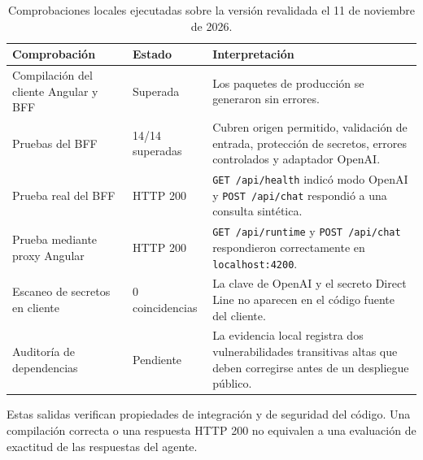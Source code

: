 \begin{table}[H]
\centering
\small
\caption{Comprobaciones locales ejecutadas sobre la versi\'on revalidada el 11 de noviembre de 2026.}
\label{tab:resultados-locales}
\begin{tabularx}{\textwidth}{p{}p{}X}
\toprule
\textbf{Comprobaci\'on} & \textbf{Estado} & \textbf{Interpretaci\'on}\\
\midrule
Compilaci\'on del cliente Angular y BFF & Superada & Los paquetes de producci\'on se generaron sin errores.\\
Pruebas del BFF & 14/14 superadas & Cubren origen permitido, validaci\'on de entrada, protecci\'on de secretos, errores controlados y adaptador OpenAI.\\
Prueba real del BFF & HTTP 200 & \texttt{GET /api/health} indic\'o modo OpenAI y \texttt{POST /api/chat} respondi\'o a una consulta sint\'etica.\\
Prueba mediante proxy Angular & HTTP 200 & \texttt{GET /api/runtime} y \texttt{POST /api/chat} respondieron correctamente en \texttt{localhost:4200}.\\
Escaneo de secretos en cliente & 0 coincidencias & La clave de OpenAI y el secreto Direct Line no aparecen en el c\'odigo fuente del cliente.\\
Auditor\'ia de dependencias & Pendiente & La evidencia local registra dos vulnerabilidades transitivas altas que deben corregirse antes de un despliegue p\'ublico.\\
\bottomrule
\end{tabularx}
\end{table}

Estas salidas verifican propiedades de integraci\'on y de seguridad del c\'odigo. Una compilaci\'on correcta o una respuesta HTTP 200 no equivalen a una evaluaci\'on de exactitud de las respuestas del agente.
